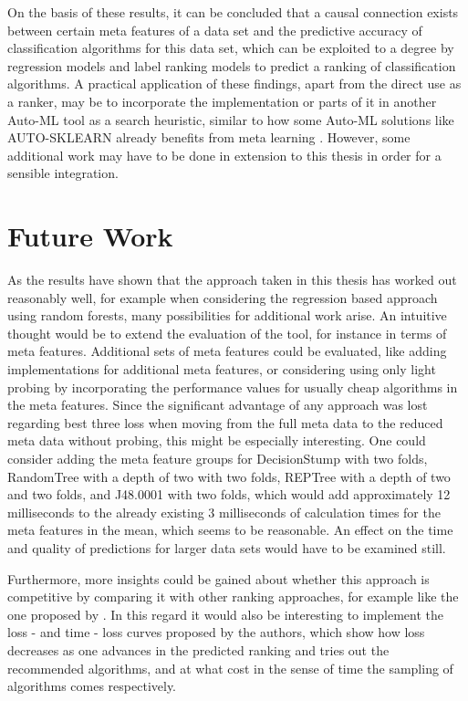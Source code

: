 On the basis of these results, it can be concluded that a causal connection exists between certain meta features of a data set and the predictive accuracy of classification algorithms for this data set, which can be exploited to a degree by regression models and label ranking models to predict a ranking of classification algorithms. A practical application of these findings, apart from the direct use as a ranker, may be to incorporate the implementation or parts of it in another Auto-ML tool as a search heuristic, similar to how some Auto-ML solutions like AUTO-SKLEARN already benefits from meta learning \cite{feurer2015efficient}. However, some additional work may have to be done in extension to this thesis in order for a sensible integration.

\section{Future Work}
\label{sec:conclusion:future}
As the results have shown that the approach taken in this thesis has worked out reasonably well, for example when considering the regression based approach using random forests, many possibilities for additional work arise. An intuitive thought would be to extend the evaluation of the tool, for instance in terms of meta features. Additional sets of meta features could be evaluated, like adding implementations for additional meta features, or considering using only light probing by incorporating the performance values for usually cheap algorithms in the meta features. Since the significant advantage of any approach was lost regarding best three loss when moving from the full meta data to the reduced meta data without probing, this might be especially interesting. One could consider adding the meta feature groups for DecisionStump with two folds, RandomTree with a depth of two with two folds, REPTree with a depth of two and two folds, and J48.0001 with two folds, which would add approximately 12 milliseconds to the already existing 3 milliseconds of calculation times for the meta features in the mean, which seems to be reasonable. An effect on the time and quality of predictions for larger data sets would have to be examined still.

Furthermore, more insights could be gained about whether this approach is competitive by comparing it with other ranking approaches, for example like the one proposed by \citeauthor{DBLP:journals/ml/AbdulrahmanBRV18} \cite{DBLP:journals/ml/AbdulrahmanBRV18}. In this regard it would also be interesting  to implement the loss - and time - loss curves proposed by the authors, which show how loss decreases as one advances in the predicted ranking and tries out the recommended algorithms, and at what cost in the sense of time the sampling of algorithms comes respectively.

